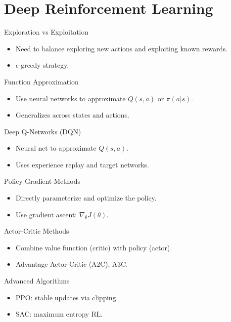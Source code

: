 \documentclass{beamer}
\begin{document}
\section{Deep Reinforcement Learning}
\begin{frame}{Exploration vs Exploitation}
 \begin{itemize}
   \item Need to balance exploring new actions and exploiting known rewards.
   \item $\epsilon$-greedy strategy.
 \end{itemize}
\end{frame}

\begin{frame}{Function Approximation}
 \begin{itemize}
   \item Use neural networks to approximate $Q(s,a)$ or $\pi(a|s)$.
   \item Generalizes across states and actions.
 \end{itemize}
\end{frame}

\begin{frame}{Deep Q-Networks (DQN)}
 \begin{itemize}
   \item Neural net to approximate $Q(s,a)$.
   \item Uses experience replay and target networks.
 \end{itemize}
\end{frame}

\begin{frame}{Policy Gradient Methods}
 \begin{itemize}
   \item Directly parameterize and optimize the policy.
   \item Use gradient ascent: $\nabla_\theta J(\theta)$.
 \end{itemize}
\end{frame}

\begin{frame}{Actor-Critic Methods}
 \begin{itemize}
   \item Combine value function (critic) with policy (actor).
   \item Advantage Actor-Critic (A2C), A3C.
 \end{itemize}
\end{frame}

\begin{frame}{Advanced Algorithms}
 \begin{itemize}
   \item PPO: stable updates via clipping.
   \item SAC: maximum entropy RL.
 \end{itemize}
\end{frame}
\end{document}

